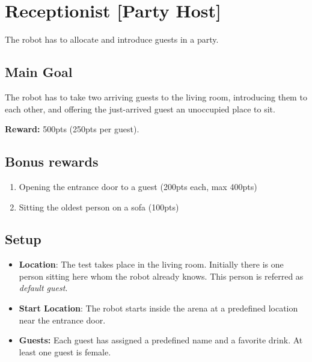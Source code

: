 \section{Receptionist [Party Host]}

The robot has to allocate and introduce guests in a party.


\subsection{Main Goal}
The robot has to take two arriving guests to the living room, introducing them to each other, and offering the just-arrived guest an unoccupied place to sit.

\noindent\textbf{Reward:} 500pts (250pts per guest).

\subsection{Bonus rewards}
\begin{enumerate}[nosep]
	\item Opening the entrance door to a guest (200pts each, max 400pts)
	\item Sitting the oldest person on a sofa (100pts)
\end{enumerate}


\subsection{Setup}
\begin{itemize}
	\item \textbf{Location}: The test takes place in the living room.
	Initially there is one person sitting here whom the robot already knows.
	This person is referred as \emph{default guest}.

	\item \textbf{Start Location}: The robot starts inside the arena at a predefined location near the entrance door.

	\item \textbf{Guests:} Each guest has assigned a predefined name and a favorite drink.
	At least one guest is female.
\end{itemize}

